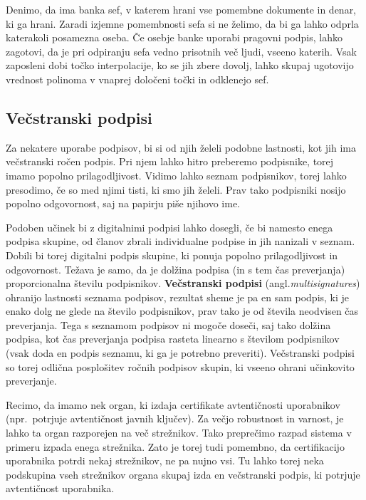 \documentclass[isrm2, tisk]{fmfdelo}
\begin{document}
\begin{primer}
    Denimo, da ima banka sef, v katerem hrani vse pomembne dokumente in denar, ki ga hrani. Zaradi
    izjemne pomembnosti sefa si ne želimo, da bi ga lahko odprla katerakoli posamezna oseba. Če 
    osebje banke uporabi pragovni podpis, lahko zagotovi, da je pri odpiranju sefa vedno prisotnih
    več ljudi, vseeno katerih. Vsak zaposleni dobi točko interpolacije, ko se jih zbere dovolj,
    lahko skupaj ugotovijo vrednost polinoma v vnaprej določeni točki in odklenejo sef.
\end{primer}

\subsection{Večstranski podpisi}
\label{sec:multisig}
Za nekatere uporabe podpisov, bi si od njih želeli podobne lastnosti, kot jih ima večstranski ročen podpis. 
Pri njem lahko hitro preberemo podpisnike, torej imamo popolno prilagodljivost. Vidimo lahko seznam 
podpisnikov, torej lahko presodimo, če so med njimi tisti, ki smo jih želeli. Prav tako podpisniki nosijo 
popolno odgovornost, saj na papirju piše njihovo ime. 

Podoben učinek bi z digitalnimi podpisi lahko dosegli, če bi namesto enega podpisa skupine, od članov 
zbrali individualne podpise in jih nanizali v seznam. Dobili bi torej digitalni podpis skupine, ki 
ponuja popolno prilagodljivost in odgovornost. Težava je samo, da je dolžina podpisa (in s tem čas 
preverjanja) proporcionalna številu podpisnikov. \textbf{Večstranski podpisi} (angl.\textit{multisignatures})
ohranijo lastnosti seznama podpisov, rezultat sheme je pa en sam podpis, ki je enako dolg ne glede 
na število podpisnikov, prav tako je od števila neodvisen čas preverjanja. Tega s seznamom podpisov 
ni mogoče doseči, saj tako dolžina podpisa, kot čas preverjanja podpisa rasteta linearno s številom 
podpisnikov (vsak doda en podpis seznamu, ki ga je potrebno preveriti). Večstranski podpisi so torej 
odlična posplošitev ročnih podpisov skupin, ki vseeno ohrani učinkovito preverjanje.

\begin{primer}
    Recimo, da imamo nek organ, ki izdaja certifikate avtentičnosti uporabnikov (npr.\ potrjuje 
    avtentičnost javnih ključev). Za večjo robustnost in varnost, je lahko ta organ razporejen 
    na več strežnikov. Tako preprečimo razpad sistema v primeru izpada enega strežnika. Zato je 
    torej tudi pomembno, da certifikacijo uporabnika potrdi nekaj strežnikov, ne pa nujno vsi. 
    Tu lahko torej neka podskupina vseh strežnikov organa skupaj izda en večstranski podpis, ki 
    potrjuje avtentičnost uporabnika.
\end{primer}
\end{document}

